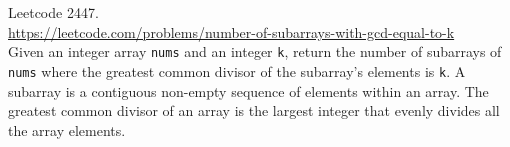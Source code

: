   Leetcode 2447.
  \\
  \url{https://leetcode.com/problems/number-of-subarrays-with-gcd-equal-to-k}
  \\
  Given an integer array \verb!nums! and an integer \verb!k!,
  return the number of subarrays of \verb!nums! where the greatest common
  divisor
  of the subarray's elements is \verb!k!.
  A subarray is a contiguous non-empty sequence of elements within an array.
  The greatest common divisor of an array is the largest integer that evenly
  divides all the array elements.
